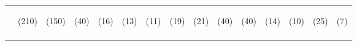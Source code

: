 \begin{tabular}{lcccccccccccccc}
 & \begin{footnotesize}(210)\end{footnotesize} & \begin{footnotesize}(150)\end{footnotesize} & \begin{footnotesize}(40)\end{footnotesize} & \begin{footnotesize}(16)\end{footnotesize} & \begin{footnotesize}(13)\end{footnotesize} & \begin{footnotesize}(11)\end{footnotesize} & \begin{footnotesize}(19)\end{footnotesize} & \begin{footnotesize}(21)\end{footnotesize} & \begin{footnotesize}(40)\end{footnotesize} & \begin{footnotesize}(40)\end{footnotesize} & \begin{footnotesize}(14)\end{footnotesize} & \begin{footnotesize}(10)\end{footnotesize} & \begin{footnotesize}(25)\end{footnotesize} & \begin{footnotesize}(7)\end{footnotesize}\\
\noalign{\smallskip}\hline\end{tabular}\\
